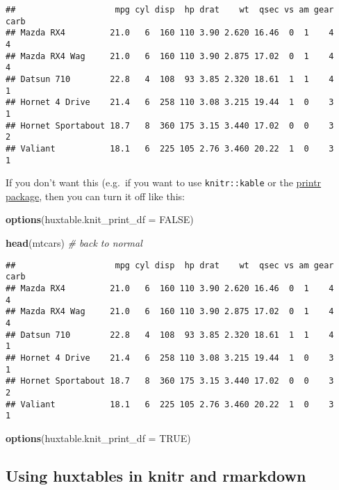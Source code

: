 \documentclass[]{article}
\newenvironment{Shaded}{\begin{snugshade}}{\end{snugshade}}
\newcommand{\CommentTok}[1]{\textcolor[rgb]{0.56,0.35,0.01}{\textit{#1}}}
\newcommand{\DataTypeTok}[1]{\textcolor[rgb]{0.13,0.29,0.53}{#1}}
\newcommand{\KeywordTok}[1]{\textcolor[rgb]{0.13,0.29,0.53}{\textbf{#1}}}
\newcommand{\NormalTok}[1]{#1}
\newcommand{\OtherTok}[1]{\textcolor[rgb]{0.56,0.35,0.01}{#1}}
\begin{document}
\begin{verbatim}
##                    mpg cyl disp  hp drat    wt  qsec vs am gear carb
## Mazda RX4         21.0   6  160 110 3.90 2.620 16.46  0  1    4    4
## Mazda RX4 Wag     21.0   6  160 110 3.90 2.875 17.02  0  1    4    4
## Datsun 710        22.8   4  108  93 3.85 2.320 18.61  1  1    4    1
## Hornet 4 Drive    21.4   6  258 110 3.08 3.215 19.44  1  0    3    1
## Hornet Sportabout 18.7   8  360 175 3.15 3.440 17.02  0  0    3    2
## Valiant           18.1   6  225 105 2.76 3.460 20.22  1  0    3    1
\end{verbatim}

\FloatBarrier

If you don't want this (e.g.~if you want to use \texttt{knitr::kable} or
the
\href{https://cran.r-project.org/package=printr/vignettes/printr.html}{printr
package}, then you can turn it off like this:

\begin{Shaded}
\begin{Highlighting}[]
\KeywordTok{options}\NormalTok{(}\DataTypeTok{huxtable.knit_print_df =} \OtherTok{FALSE}\NormalTok{)}

\KeywordTok{head}\NormalTok{(mtcars) }\CommentTok{# back to normal}
\end{Highlighting}
\end{Shaded}

\begin{verbatim}
##                    mpg cyl disp  hp drat    wt  qsec vs am gear carb
## Mazda RX4         21.0   6  160 110 3.90 2.620 16.46  0  1    4    4
## Mazda RX4 Wag     21.0   6  160 110 3.90 2.875 17.02  0  1    4    4
## Datsun 710        22.8   4  108  93 3.85 2.320 18.61  1  1    4    1
## Hornet 4 Drive    21.4   6  258 110 3.08 3.215 19.44  1  0    3    1
## Hornet Sportabout 18.7   8  360 175 3.15 3.440 17.02  0  0    3    2
## Valiant           18.1   6  225 105 2.76 3.460 20.22  1  0    3    1
\end{verbatim}

\begin{Shaded}
\begin{Highlighting}[]
\KeywordTok{options}\NormalTok{(}\DataTypeTok{huxtable.knit_print_df =} \OtherTok{TRUE}\NormalTok{)}
\end{Highlighting}
\end{Shaded}

\FloatBarrier

\hypertarget{using-huxtables-in-knitr-and-rmarkdown}{%
\subsection{Using huxtables in knitr and
rmarkdown}\label{using-huxtables-in-knitr-and-rmarkdown}}
\end{document}
